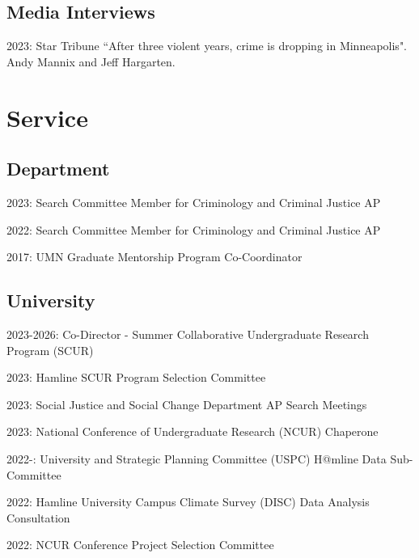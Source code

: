 \documentclass[letterpaper]{article}
\renewenvironment{itemize}{
  \begin{list}{}{
    \setlength{\leftmargin}{1.5em}
  }
}{
  \end{list}
}
\begin{document}
\subsection*{Media Interviews}
\begin{itemize}

\item 2023: Star Tribune ``After three violent years, crime is dropping in Minneapolis". Andy Mannix and Jeff Hargarten.  

\end{itemize}

\section*{\textbf{Service}}

\subsection*{Department}
\begin{itemize}

\item 2023: Search Committee Member for Criminology and Criminal Justice AP
\item 2022: Search Committee Member for Criminology and Criminal Justice AP
\item 2017: UMN Graduate Mentorship Program Co-Coordinator

\end{itemize}

\subsection*{University}
\begin{itemize}
\item 2023-2026: Co-Director - Summer Collaborative Undergraduate Research Program (SCUR)
\item 2023: Hamline SCUR Program Selection Committee
\item 2023: Social Justice and Social Change Department AP Search Meetings
\item 2023: National Conference of Undergraduate Research (NCUR) Chaperone
\item 2022-: University and Strategic Planning Committee (USPC) H@mline Data Sub-Committee
\item 2022: Hamline University Campus Climate Survey (DISC) Data Analysis Consultation
\item 2022: NCUR Conference Project Selection Committee
\end{itemize}
\end{document}
